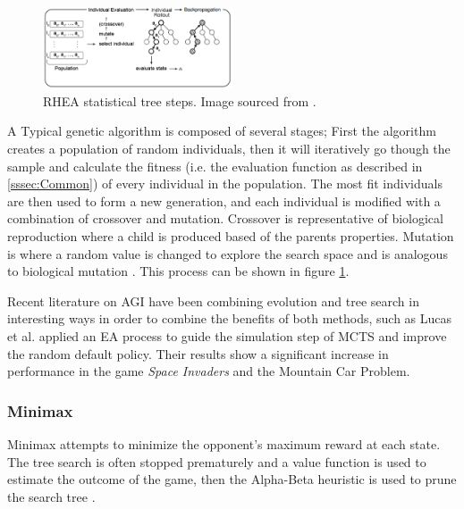 \documentclass[journal]{IEEEtran}
\begin{document}
			
			\begin{figure}[h]
		   		 \centering
		   		 \includegraphics[width=0.5\textwidth]{RHEArollout}
		    		 \caption{RHEA statistical tree steps. Image sourced from \cite{gaina2017rolling}. }
		  		 \label{fig:RHEArollout}
			\end{figure}
			
			A Typical genetic algorithm is composed of several stages;
			First the algorithm creates a population of random individuals, then it will iteratively go though the sample and calculate the fitness (i.e. the evaluation function as described in \ref{sssec:Common}) of every individual in the population. 
			The most fit individuals are then used to form a new generation, and each individual is modified with a combination of crossover and mutation. 
			Crossover is representative of biological reproduction where a child is produced based of the parents properties. Mutation is where a random value is changed to explore the search space and is analogous to biological mutation \cite{back1996evolutionary, vcrepinvsek2013exploration, perez2013rolling, gaina2017rolling, gaina2017analysis}.
			This process can be shown in figure \ref{fig:RHEArollout}.
			


			Recent literature on AGI have been combining evolution and tree search in interesting ways in order to combine the benefits of both methods, such as Lucas et al. \cite{lucas2014fast} applied an EA process to guide the simulation step of MCTS and improve the random default policy. Their results show a significant increase in performance in the game \textit{Space Invaders} and the Mountain Car Problem.
			
		
		
		\subsubsection{Minimax}

				Minimax attempts to minimize the opponent's maximum reward at each state. The tree search is often stopped prematurely and a value function is used to estimate the outcome of the game, then the Alpha-Beta heuristic is used to prune the search tree \cite{browne2012survey, knuth1975analysis}.
			
\end{document}
